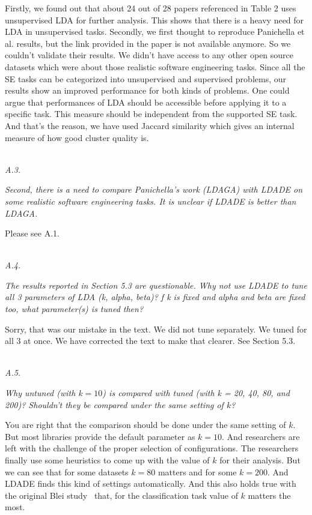 \documentclass[conference]{IEEEtran}
\begin{document}
Firstly, we found out that about 24 out of 28 papers referenced in Table 2 uses unsupervised LDA for further analysis. This shows that there is a heavy need for LDA in unsupervised tasks. Secondly, we first thought to reproduce Panichella et al. results, but the link provided in the paper is not available anymore. So we couldn't validate their results. We didn't have access to any other open source datasets which were about those realistic software engineering tasks. Since all the SE tasks can be categorized into unsupervised and supervised problems, our results show an improved performance for both kinds of problems. One could argue that performances of LDA should be accessible before applying it to a specific task. This measure should be independent from the supported SE task. And that's the reason, we have used Jaccard similarity which gives an internal measure of how good cluster quality is.

\noindent
\textit{\\A.3.} 

\textit{Second, there is a need to compare Panichella's work (LDAGA) with LDADE on some realistic software engineering tasks. It is unclear if LDADE is better than LDAGA.\\}

Please see A.1.

\noindent
\textit{\\A.4.}

\textit{The results reported in Section 5.3 are questionable. Why not use LDADE to tune all 3 parameters of LDA (k, alpha, beta)? f k is fixed and alpha and beta are fixed too, what parameter(s) is tuned then?\\}

 Sorry, that was our mistake in the text. We did not tune separately. We tuned for all 3 at once. We have corrected the text to make that clearer. See Section 5.3.

\noindent
\textit{\\A.5.}  

\textit{Why untuned (with $k = 10$) is compared with tuned (with k = 20, 40, 80, and 200)? Shouldn't they be compared under the same setting of $k$? \\}

You are right that the comparison should be done under the same setting of $k$. But most libraries provide the default parameter as $k=10$. And researchers are left with the challenge of the proper selection of configurations. The researchers finally use some heuristics to come up with the value of $k$ for their analysis. But we can see that for some datasets $k=80$ matters and for some $k=200$. And LDADE finds this kind of settings automatically. And this also holds true with the original Blei study~\cite{blei2003latent} that, for the classification task value of $k$ matters the most.
\end{document}
